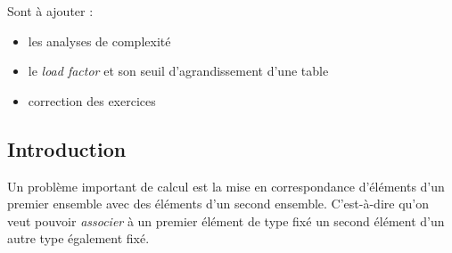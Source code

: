\documentclass[../../../main.tex]{subfiles}
\begin{document}
Sont à ajouter :
\begin{itemize}
	\item les analyses de complexité
	\item le \textit{load factor} et son seuil d'agrandissement d'une table
	\item correction des exercices
\end{itemize}
\subsection{Introduction}
\label{sub:dict_motivation}
Un problème important de calcul est la mise en correspondance d'éléments d'un premier ensemble avec des éléments d'un second ensemble. C'est-à-dire qu'on veut pouvoir \textit{associer} à un premier élément de type fixé un second élément d'un autre type également fixé.
\end{document}
